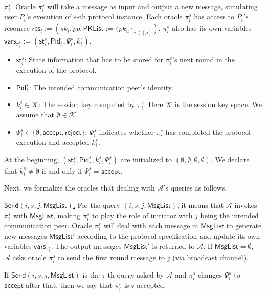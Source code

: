 \documentclass[a4paper,11pt]{article}
\begin{document}
\begin{sloppypar}
\smallskip\noindent\uline{$\pi_i^s$.} Oracle $\pi_i^s$ will take a message as input and output a new message, simulating user $P_i$'s execution of $s$-th protocol instance. Each oracle $\pi_i^s$ has access to $P_i$'s resource $\mathsf{res}_i := (sk_i, pp, \mathsf{PKList} := \{pk_u\}_{u \in [\mu]})$. $\pi_i^s$ also has its own variables $\mathsf{vars}_{\pi_i^s} := (\mathsf{st}_i^s, \mathsf{Pid}_i^s, \Psi_i^s, k_i^s)$.
\begin{itemize}
    \item $\mathsf{st}_i^s$: State information that has to be stored for $\pi_i^s$'s next round in the execution of the protocol.
    \item $\mathsf{Pid}_i^s$: The intended communication peer's identity.
    \item $k_i^s \in \mathcal{K}$: The session key computed by $\pi_i^s$. Here $\mathcal{K}$ is the session key space. We assume that $\emptyset \in \mathcal{K}$.
    \item $\Psi_i^s \in \{\emptyset, \mathsf{accept}, \mathsf{reject}\}$: $\Psi_i^s$ indicates whether $\pi_i^s$ has completed the protocol execution and accepted $k_i^s$.
\end{itemize}
At the beginning, $(\mathsf{st}_i^s, \mathsf{Pid}_i^s, k_i^s, \Psi_i^s)$ are initialized to $(\emptyset, \emptyset, \emptyset, \emptyset)$. We declare that $k_i^s \neq \emptyset$ if and only if $\Psi_i^s = \mathsf{accept}$.

Next, we formalize the oracles that dealing with $\mathcal{A}$'s queries as follows.

\smallskip\noindent\uline{$\mathsf{Send}(i, s, j, \mathsf{MsgList})$.} For the query $(i, s, j, \mathsf{MsgList})$, it means that $\mathcal{A}$ invokes $\pi_i^s$ with $\mathsf{MsgList}$, making $\pi_i^s$ to play the role of initiator with $j$ being the intended communication peer. Oracle $\pi_i^s$ will deal with each message in $\mathsf{MsgList}$ to generate new messages $\mathsf{MsgList}'$ according to the protocol specification and update its own variables $\mathsf{vars}_{\pi_i^s}$. The output messages $\mathsf{MsgList}'$ is returned to $\mathcal{A}$. If $\mathsf{MsgList} = \emptyset$, $\mathcal{A}$ asks oracle $\pi_i^s$ to send the first round message to $j$ (via broadcast channel).

If $\mathsf{Send}(i, s, j, \mathsf{MsgList})$ is the $\tau$-th query asked by $\mathcal{A}$ and $\pi_i^s$ changes $\Psi_i^s$ to $\mathsf{accept}$ after that, then we say that $\pi_i^s$ is $\tau$-accepted.


\end{sloppypar}
\end{document}
